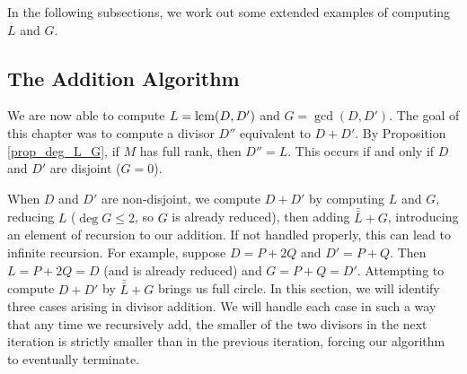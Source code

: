 In the following subsections, we work out some extended examples of computing $L$ and $G$.




\subsection{The Addition Algorithm}

We are now able to compute $L = \operatorname{lcm}(D, D')$ and $G = \gcd(D, D')$.
The goal of this chapter was to compute a divisor $D''$ equivalent to $D + D'$.
By Proposition \ref{prop_deg_L_G}, if $M$ has full rank, then $D'' = L$.
This occurs if and only if $D$ and $D'$ are disjoint ($G = 0$).

When $D$ and $D'$ are non-disjoint,
we compute $D + D'$ by computing $L$ and $G$, reducing $L$ ($\deg G \leq 2$, so $G$ is already reduced),
then adding $\bar{\bar L} + G$, introducing an element of recursion to our addition.
If not handled properly, this can lead to infinite recursion.
For example, suppose $D = P + 2Q$ and $D' = P + Q$.
Then $L = P + 2Q = D$ (and is already reduced) and $G = P + Q = D'$.
Attempting to compute $D + D'$ by $\bar{\bar L} + G$ brings us full circle.
In this section, we will identify three cases arising in divisor addition.
We will handle each case in such a way that any time we recursively add,
the smaller of the two divisors in the next iteration
is strictly smaller than in the previous iteration,
forcing our algorithm to eventually terminate.

